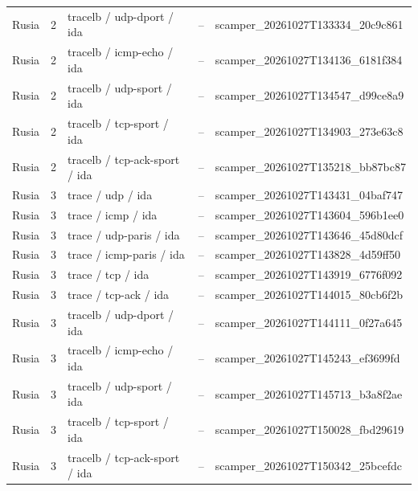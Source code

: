 \begin{longtable}{p{2cm}p{1.15cm}p{4.2cm}p{2.2cm}p{4.95cm}}
Rusia & 2 & tracelb / udp-dport / ida & -- & scamper\_\allowbreak{}20261027T133334\_\allowbreak{}20c9c861 \\
Rusia & 2 & tracelb / icmp-echo / ida & -- & scamper\_\allowbreak{}20261027T134136\_\allowbreak{}6181f384 \\
Rusia & 2 & tracelb / udp-sport / ida & -- & scamper\_\allowbreak{}20261027T134547\_\allowbreak{}d99ce8a9 \\
Rusia & 2 & tracelb / tcp-sport / ida & -- & scamper\_\allowbreak{}20261027T134903\_\allowbreak{}273e63c8 \\
Rusia & 2 & tracelb / tcp-ack-sport / ida & -- & scamper\_\allowbreak{}20261027T135218\_\allowbreak{}bb87bc87 \\
Rusia & 3 & trace / udp / ida & -- & scamper\_\allowbreak{}20261027T143431\_\allowbreak{}04baf747 \\
Rusia & 3 & trace / icmp / ida & -- & scamper\_\allowbreak{}20261027T143604\_\allowbreak{}596b1ee0 \\
Rusia & 3 & trace / udp-paris / ida & -- & scamper\_\allowbreak{}20261027T143646\_\allowbreak{}45d80dcf \\
Rusia & 3 & trace / icmp-paris / ida & -- & scamper\_\allowbreak{}20261027T143828\_\allowbreak{}4d59ff50 \\
Rusia & 3 & trace / tcp / ida & -- & scamper\_\allowbreak{}20261027T143919\_\allowbreak{}6776f092 \\
Rusia & 3 & trace / tcp-ack / ida & -- & scamper\_\allowbreak{}20261027T144015\_\allowbreak{}80cb6f2b \\
Rusia & 3 & tracelb / udp-dport / ida & -- & scamper\_\allowbreak{}20261027T144111\_\allowbreak{}0f27a645 \\
Rusia & 3 & tracelb / icmp-echo / ida & -- & scamper\_\allowbreak{}20261027T145243\_\allowbreak{}ef3699fd \\
Rusia & 3 & tracelb / udp-sport / ida & -- & scamper\_\allowbreak{}20261027T145713\_\allowbreak{}b3a8f2ae \\
Rusia & 3 & tracelb / tcp-sport / ida & -- & scamper\_\allowbreak{}20261027T150028\_\allowbreak{}fbd29619 \\
Rusia & 3 & tracelb / tcp-ack-sport / ida & -- & scamper\_\allowbreak{}20261027T150342\_\allowbreak{}25bcefdc \\
\bottomrule
\end{longtable}
\endgroup
